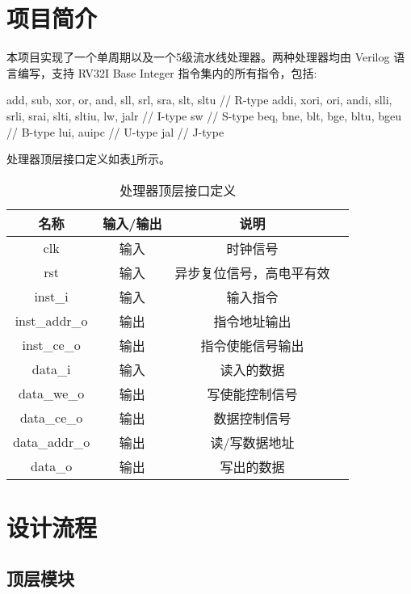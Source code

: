 \documentclass[lang=zh]{sjtuarticle}	%
\begin{document}
\sloppy %


\tableofcontents
\newpage

\section{项目简介}

本项目实现了一个单周期以及一个5级流水线处理器。两种处理器均由 Verilog 语言编写，支持 RV32I Base Integer 指令集内的所有指令，包括:
\begin{codeblock}
add, sub, xor, or, and, sll, srl, sra, slt, sltu	// R-type
addi, xori, ori, andi, slli, srli, srai, slti, sltiu, lw, jalr	// I-type
sw	// S-type
beq, bne, blt, bge, bltu, bgeu	// B-type
lui, auipc	// U-type
jal	// J-type
\end{codeblock}

处理器顶层接口定义如表\ref{tab:top_io}所示。

\begin{table}[!htp]
	\centering
	\caption{处理器顶层接口定义}
	\label{tab:top_io}
	\begin{tabular}{|c|c|c|c|}
		\hline
		名称 & 输入/输出 & 说明  \\
		\hline
		clk & 输入 & 时钟信号 \\
		\hline
		rst & 输入 & 异步复位信号，高电平有效 \\
		\hline
		inst\_i & 输入 & 输入指令 \\
		\hline
		inst\_addr\_o & 输出 & 指令地址输出 \\
		\hline
		inst\_ce\_o & 输出 & 指令使能信号输出 \\
		\hline
		data\_i & 输入 & 读入的数据 \\
		\hline
		data\_we\_o & 输出 & 写使能控制信号 \\
		\hline
		data\_ce\_o & 输出 & 数据控制信号 \\
		\hline
		data\_addr\_o & 输出 & 读/写数据地址 \\
		\hline
		data\_o & 输出 & 写出的数据 \\
		\hline
	\end{tabular}
\end{table}

\section{设计流程}

\subsection{顶层模块}
\end{document}
